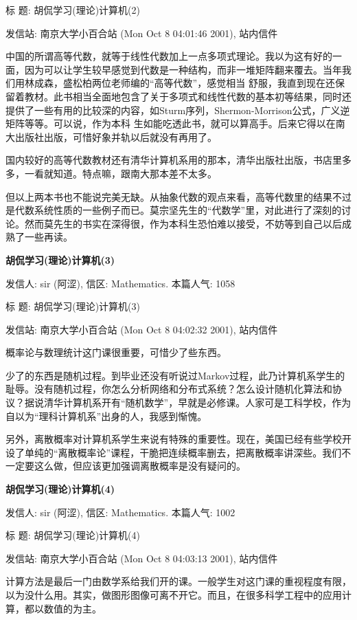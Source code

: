 标  题: 胡侃学习(理论)计算机(2)\cite{sir2}

发信站: 南京大学小百合站 (Mon Oct  8 04:01:46 2001), 站内信件

中国的所谓高等代数，就等于线性代数加上一点多项式理论。我以为这有好的一面，因为可以让学生较早感觉到代数是一种结构，而非一堆矩阵翻来覆去。当年我们用林成森，盛松柏两位老师编的“高等代数”，感觉相当
舒服，我直到现在还保留着教材。此书相当全面地包含了关于多项式和线性代数的基本初等结果，同时还提供了一些有用的比较深的内容，如Sturm序列，Shermon-Morrison公式，广义逆矩阵等等。可以说，作为本科
生如能吃透此书，就可以算高手。后来它得以在南大出版社出版，可惜好象并轨以后就没有再用了。

国内较好的高等代数教材还有清华计算机系用的那本，清华出版社出版，书店里多多，一看就知道。特点嘛，跟南大那本差不太多。

但以上两本书也不能说完美无缺。从抽象代数的观点来看，高等代数里的结果不过是代数系统性质的一些例子而已。莫宗坚先生的“代数学”里，对此进行了深刻的讨论。然而莫先生的书实在深得很，作为本科生恐怕难以接受，不妨等到自己以后成熟了一些再读。

\textbf{胡侃学习(理论)计算机(3)}

发信人: sir (阿涩), 信区: Mathematics. 本篇人气: 1058

标  题: 胡侃学习(理论)计算机(3)\cite{sir3}

发信站: 南京大学小百合站 (Mon Oct  8 04:02:32 2001), 站内信件

概率论与数理统计这门课很重要，可惜少了些东西。

少了的东西是随机过程。到毕业还没有听说过Markov过程，此乃计算机系学生的耻辱。没有随机过程，你怎么分析网络和分布式系统？怎么设计随机化算法和协议？据说清华计算机系开有“随机数学”，早就是必修课。人家可是工科学校，作为自以为“理科计算机系”出身的人，我感到惭愧。

另外，离散概率对计算机系学生来说有特殊的重要性。现在，美国已经有些学校开设了单纯的“离散概率论”课程，干脆把连续概率删去，把离散概率讲深些。我们不一定要这么做，但应该更加强调离散概率是没有疑问的。

\textbf{胡侃学习(理论)计算机(4)}

发信人: sir (阿涩), 信区: Mathematics. 本篇人气: 1002

标  题: 胡侃学习(理论)计算机(4)\cite{sir4}

发信站: 南京大学小百合站 (Mon Oct  8 04:03:13 2001), 站内信件


计算方法是最后一门由数学系给我们开的课。一般学生对这门课的重视程度有限，以为没什么用。其实，做图形图像可离不开它。而且，在很多科学工程中的应用计算，都以数值的为主。

